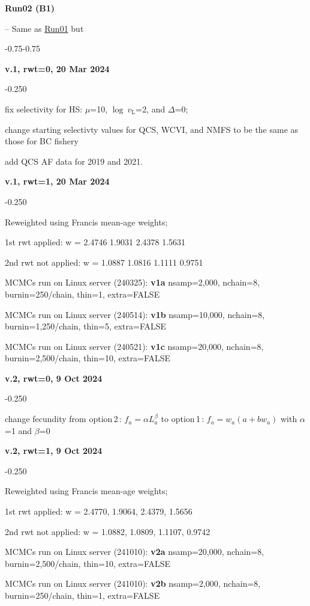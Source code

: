 \hypertarget{R02}{\textbf{Run02 (B1)}} -- Same as \hyperlink{R01}{Run01} but
\begin{itemize_csas}{-0.75}{-0.75}
	\item \textbf{v.1, rwt=0, 20 Mar 2024}
	\begin{itemize_csas}{-0.25}{0}
		\item fix selectivity for HS: $\mu$=10, $\log~v_\text{L}$=2, and $\Delta$=0;
		\item change starting selectivty values for QCS, WCVI, and NMFS to be the same as those for BC fishery
		\item add QCS AF data for 2019 and 2021.
	\end{itemize_csas}
	\item \textbf{v.1, rwt=1, 20 Mar 2024}
	\begin{itemize_csas}{-0.25}{0}
		\item Reweighted using Francis mean-age weights;
		\item 1st rwt applied: w =  2.4746 1.9031 2.4378 1.5631
		\item 2nd rwt not applied: w = 1.0887 1.0816 1.1111 0.9751
		\item MCMCs run on Linux server (240325): \textbf{v1a} nsamp=2,000, nchain=8, burnin=250/chain, thin=1, extra=FALSE
		\item MCMCs run on Linux server (240514): \textbf{v1b} nsamp=10,000, nchain=8, burnin=1,250/chain, thin=5, extra=FALSE
		\item MCMCs run on Linux server (240521): \textbf{v1c} nsamp=20,000, nchain=8, burnin=2,500/chain, thin=10, extra=FALSE
	\end{itemize_csas}
	\item \textbf{v.2, rwt=0, 9 Oct 2024}
	\begin{itemize_csas}{-0.25}{0}
		\item change fecundity from option\,2\,: $f_a = \alpha L_a^{\beta}$ to option\,1\,:  $f_a = w_a (a + b w_a)$ with $\alpha$=1 and $\beta$=0
	\end{itemize_csas}
	\item \textbf{v.2, rwt=1, 9 Oct 2024}
	\begin{itemize_csas}{-0.25}{0}
		\item Reweighted using Francis mean-age weights;
		\item 1st rwt applied: w =  2.4770, 1.9064, 2.4379, 1.5656 
		\item 2nd rwt not applied: w = 1.0882, 1.0809, 1.1107, 0.9742
		\item MCMCs run on Linux server (241010): \textbf{v2a} nsamp=20,000, nchain=8, burnin=2,500/chain, thin=10, extra=FALSE
		\item MCMCs run on Linux server (241010): \textbf{v2b} nsamp=2,000, nchain=8, burnin=250/chain, thin=1, extra=FALSE
	\end{itemize_csas}
\end{itemize_csas}

